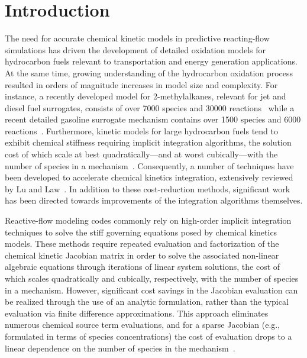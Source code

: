 \documentclass[preprint]{elsarticle}
\begin{document}
\clearpage

\section{Introduction}
\label{sec:Intro}

The need for accurate chemical kinetic models in predictive reacting-flow simulations has driven the development of detailed oxidation models for hydrocarbon fuels relevant to transportation and energy generation applications.
At the same time, growing understanding of the hydrocarbon oxidation process resulted in orders of magnitude increases in model size and complexity.
For instance, a recently developed model for 2-methylalkanes, relevant for jet and diesel fuel surrogates, consists of over 7000 species and 30000 reactions~\cite{Sarathy:2011kx} while a recent detailed gasoline surrogate mechanism contains over 1500 species and 6000 reactions~\cite{Mehl:2011jn}.
Furthermore, kinetic models for large hydrocarbon fuels tend to exhibit chemical stiffness requiring implicit integration algorithms, the solution cost of which scale at best quadratically---and at worst cubically---with the number of species in a mechanism~\cite{Lu:2009gh}.
Consequently, a number of techniques have been developed to accelerate chemical kinetics integration, extensively reviewed by Lu and Law~\cite{Lu:2009gh}.
In addition to these cost-reduction methods, significant work has been directed towards improvements of the integration algorithms themselves.

Reactive-flow modeling codes commonly rely on high-order implicit integration techniques to solve the stiff governing equations posed by chemical kinetics models.
These methods require repeated evaluation and factorization of the chemical kinetic Jacobian matrix in order to solve the associated non-linear algebraic equations through iterations of linear system solutions, the cost of which scales quadratically and cubically, respectively, with the number of species in a mechanism.
However, significant cost savings in the Jacobian evaluation can be realized through the use of an analytic formulation, rather than the typical evaluation via finite difference approximations.
This approach eliminates numerous chemical source term evaluations, and for a sparse Jacobian (e.g., formulated in terms of species concentrations) the cost of evaluation drops to a linear dependence on the number of species in the mechanism~\cite{Lu:2009gh}.
\end{document}
